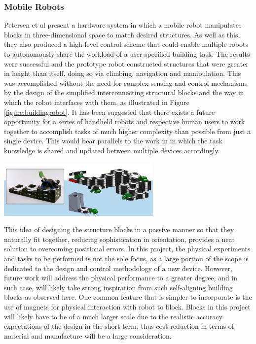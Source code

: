 \documentclass[11pt]{article}
\begin{document}
\subsubsection{Mobile Robots} \label{mobilerobots}
Petersen et al \cite{Petersen2011} present a hardware system in which a mobile robot manipulates blocks in three-dimensional space to match desired structures. As well as this, they also produced a high-level control scheme that could enable multiple robots to autonomously share the workload of a user-specified building task. The results were successful and the prototype robot constructed structures that were greater in height than itself, doing so via climbing, navigation and manipulation. This was accomplished without the need for complex sensing and control mechanisms by the design of the simplified interconnecting structural blocks and the way in which the robot interfaces with them, as illustrated in Figure \ref{figure:buildingrobot}. It has been suggested that there exists a future opportunity for a series of handheld robots and respective human users to work together to accomplish tasks of much higher complexity than possible from just a single device. This would bear parallels to the work in \cite{Petersen2011} in which the task knowledge is shared and updated between multiple devices accordingly.

\begin{center}
\includegraphics[width = 0.6\textwidth]{buildingrobot.png}
\label{figure:buildingrobot}
\end{center}

This idea of designing the structure blocks in a passive manner so that they naturally fit together, reducing sophistication in orientation, provides a neat solution to overcoming positional errors. In this project, the physical experiments and tasks to be performed is not the sole focus, as a large portion of the scope is dedicated to the design and control methodology of a new device. However, future work will address the physical performance to a greater degree, and in such case, will likely take strong inspiration from such self-aligning building blocks as observed here. One common feature that is simpler to incorporate is the use of magnets for physical interaction with robot to block. Blocks in this project will likely have to be of a much larger scale due to the realistic accuracy expectations of the design in the short-term, thus cost reduction in terms of material and manufacture will be a large consideration.
\end{document}
